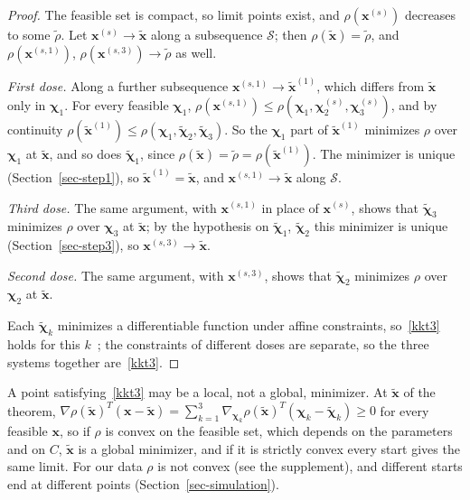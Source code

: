 \documentclass[11pt]{article}
\theoremstyle{plain}
\theoremstyle{remark}
\numberwithin{equation}{section}
\begin{document}
\begin{proof}
The feasible set is compact, so limit points exist, and $\rho(\bm x^{(s)})$
decreases to some $\widetilde\rho$. Let $\bm x^{(s)}\to\widetilde{\bm x}$ along a
subsequence $\mathcal S$; then $\rho(\widetilde{\bm x})=\widetilde\rho$, and
$\rho(\bm x^{(s,1)})$, $\rho(\bm x^{(s,3)})\to\widetilde\rho$ as well.

\emph{First dose.} Along a further subsequence $\bm x^{(s,1)}\to\widetilde{\bm x}^{(1)}$, which
differs from $\widetilde{\bm x}$ only in $\bm\chi_1$. For every feasible $\bm\chi_1$,
$\rho(\bm x^{(s,1)})\le\rho(\bm\chi_1,\bm\chi_2^{(s)},\bm\chi_3^{(s)})$, and by
continuity $\rho(\widetilde{\bm x}^{(1)})\le\rho(\bm\chi_1,\widetilde{\bm\chi}_2,\widetilde{\bm\chi}_3)$.
So the $\bm\chi_1$ part of $\widetilde{\bm x}^{(1)}$ minimizes $\rho$ over $\bm\chi_1$ at $\widetilde{\bm x}$, and so
does $\widetilde{\bm\chi}_1$, since $\rho(\widetilde{\bm x})=\widetilde\rho=\rho(\widetilde{\bm x}^{(1)})$. The
minimizer is unique (Section~\ref{sec-step1}), so $\widetilde{\bm x}^{(1)}=\widetilde{\bm x}$, and
$\bm x^{(s,1)}\to\widetilde{\bm x}$ along $\mathcal S$.

\emph{Third dose.} The same argument, with $\bm x^{(s,1)}$ in place of
$\bm x^{(s)}$, shows that $\widetilde{\bm\chi}_3$ minimizes $\rho$ over $\bm\chi_3$ at
$\widetilde{\bm x}$; by the hypothesis on $\widetilde{\bm\chi}_1$, $\widetilde{\bm\chi}_2$ this
minimizer is unique (Section~\ref{sec-step3}), so $\bm x^{(s,3)}\to\widetilde{\bm x}$.

\emph{Second dose.} The same argument, with $\bm x^{(s,3)}$, shows that
$\widetilde{\bm\chi}_2$ minimizes $\rho$ over $\bm\chi_2$ at $\widetilde{\bm x}$.

Each $\widetilde{\bm\chi}_k$ minimizes a differentiable function under affine
constraints, so~\eqref{kkt3} holds for this $k$~\cite[Section~3.4]{1999Bertsekas};
the constraints of different doses are separate, so the three systems together
are~\eqref{kkt3}.
\end{proof}

A point satisfying~\eqref{kkt3} may be a local, not a global, minimizer. At
$\widetilde{\bm x}$ of the theorem,
$\nabla\rho(\widetilde{\bm x})^T(\bm x-\widetilde{\bm x})=\sum_{k=1}^3\nabla_{\bm\chi_k}\rho(\widetilde{\bm x})^T(\bm\chi_k-\widetilde{\bm\chi}_k)\ge 0$
for every feasible $\bm x$, so if $\rho$ is convex on the feasible set, which
depends on the parameters and on $C$, $\widetilde{\bm x}$ is a global minimizer, and
if it is strictly convex every start gives the same limit. For our data $\rho$
is not convex (see the supplement), and different starts end at different
points (Section~\ref{sec-simulation}).
\end{document}
